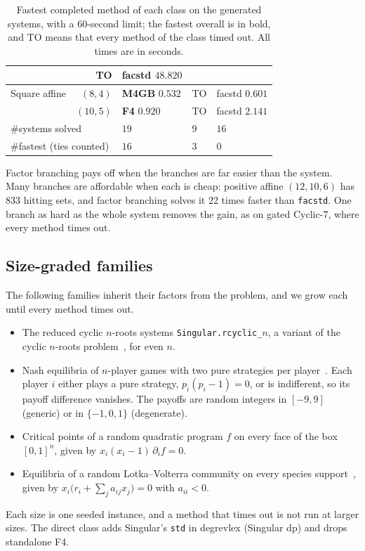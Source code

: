 \begin{table}[pos=htbp]
{\begin{tabular}{l r l l l}
      & TO & facstd $48.820$ \\
      \hline
      Square affine & $(8,4)$ & \textbf{M4GB} $\mathbf{0.532}$ &
      TO & facstd $0.601$ \\
      & $(10,5)$ & \textbf{F4} $\mathbf{0.920}$ &
      TO & facstd $2.141$ \\
      \hline
      \multicolumn{2}{l}{\#systems solved} & $19$ & $9$ & $16$ \\
      \multicolumn{2}{l}{\#fastest (ties counted)} & $16$ & $3$ & $0$ \\
      \hline
    \end{tabular}%
  }
  \caption{Fastest completed method of each class on the generated systems,
    with a 60-second limit; the fastest overall is in bold, and TO means that
    every method of the class timed out. All times are in seconds.}
  \label{tab:baseline-comparison}
\end{table}

Factor branching pays off when the branches are far easier than the system.
Many branches are affordable when each is cheap: positive affine $(12,10,6)$
has 833 hitting sets, and factor branching solves it 22 times faster than
\texttt{facstd}. One branch as hard as the whole system removes the gain, as
on gated Cyclic-7, where every method times out.

\subsection{Size-graded families}
\label{subsec:scaling-families}

The following families inherit their factors from the problem, and we
grow each until every method times out.
\begin{itemize}
  \item The reduced cyclic $n$-roots systems \texttt{Singular.rcyclic\_$n$}, a
    variant of the cyclic $n$-roots problem~\cite{bjorck1991cyclic}, for even
    $n$.
  \item Nash equilibria of $n$-player games with two pure strategies per
    player~\cite{sturmfels2002solving}.  Each player $i$ either plays a pure
    strategy, $p_i(p_i-1)=0$, or is indifferent, so its payoff difference
    vanishes.  The payoffs are random integers in $[-9,9]$ (generic) or in
    $\{-1,0,1\}$ (degenerate).
  \item Critical points of a random quadratic program $f$ on every face of the
    box $[0,1]^n$, given by $x_i(x_i-1)\,\partial_i f=0$.
  \item Equilibria of a random Lotka--Volterra community on every species
    support~\cite{hofbauer1998evolutionary}, given by
    $x_i\bigl(r_i+\sum_j a_{ij}x_j\bigr)=0$ with $a_{ii}<0$.
\end{itemize}
Each size is one seeded instance, and a method that times out is not run at
larger sizes. The direct class adds Singular's \texttt{std} in degrevlex
(Singular dp) and drops standalone F4.

